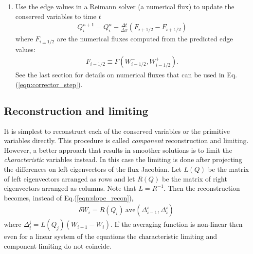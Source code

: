 \documentclass[12pt]{article}
\theoremstyle{definition}
\theoremstyle{definition}
\theoremstyle{definition}
\newcommand{\eqr}[1]{Eq.\thinspace(#1)}
\begin{document}
\begin{enumerate}
\item Use the edge values in a Reimann solver (a numerical flux) to
  update the conserved variables to time $t$
  \begin{align}
    Q^{n+1}_i = Q_i^n - \frac{\Delta t}{\Delta x}(F_{i+1/2}-F_{i+1/2}) \label{eqn:corrector_step}
  \end{align}
  where $F_{i\pm 1/2}$ are the numerical fluxes computed from the
  predicted edge values:
  \begin{align}
    F_{i-1/2} \equiv F(W_{i-1/2}^-, W_{i-1/2}^+).
  \end{align}
  See the last section for details on numerical fluxes that can be
  used in \eqr{\ref{eqn:corrector_step}}.

\end{enumerate}

\subsection{Reconstruction and limiting}

It is simplest to reconstruct each of the conserved variables or the
primitive variables directly. This procedure is called
\emph{component} reconstruction and limiting. However, a better
approach that results in smoother solutions is to limit the
\emph{characteristic} variables instead. In this case the limiting is
done after projecting the differences on left eigenvectors of the flux
Jacobian. Let $L(Q)$ be the matrix of left eigenvectors arranged as
rows and let $R(Q)$ be the matrix of right eigenvectors arranged as
columns. Note that $L=R^{-1}$. Then the reconstruction becomes,
instead of \eqr{\ref{eqn:slope_recon}},
\begin{align}
  \delta W_i = R(Q_i)\ \mathrm{ave}(\Delta^i_{i-1}, \Delta^i_i)
\end{align}
where $\Delta^j_i = L(Q_j)(W_{i+1}-W_i)$. If the averaging function is
non-linear then even for a linear system of the equations the
characteristic limiting and component limiting do not coincide.
\end{document}
